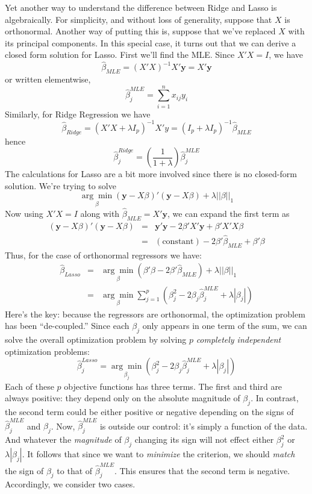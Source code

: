 Yet another way to understand the difference between Ridge and Lasso is algebraically. For simplicity, and without loss of generality, suppose that $X$ is orthonormal. Another way of putting this is, suppose that we've replaced $X$ with its principal components. In this special case, it turns out that we can derive a closed form solution for Lasso. First we'll find the MLE. Since $X'X = I$, we have
	$$\widehat{\beta}_{MLE} = (X'X)^{-1}X'\textbf{y} = X'\textbf{y}$$
or written elementwise,
	$$\widehat{\beta}^{MLE}_j = \sum_{i=1}^n x_{ij}y_i$$
Similarly, for Ridge Regression we have
	$$\widehat{\beta}_{Ridge} =\left(X'X + \lambda I_p \right)^{-1}X'y = \left(I_p + \lambda I_p \right)^{-1} \widehat{\beta}_{MLE}$$
hence
	$$\widehat{\beta}^{Ridge}_j =  \left(\frac{1}{1+\lambda}\right)\widehat{\beta}^{MLE}_j$$
The calculations for Lasso are a bit more involved since there is no closed-form solution. We're trying to solve
	$$\underset{\beta}{\arg \min} (\mathbf{y}  - X\beta)' (\mathbf{y} - X\beta) + \lambda \left| \left| \beta\right| \right|_1$$
Now using $X'X = I$ along with $\widehat{\beta}_{MLE} = X'\textbf{y}$, we can expand the first term as
	\begin{eqnarray*}
		 (\mathbf{y}  - X\beta)' (\mathbf{y} - X\beta) &=& \mathbf{y}'\mathbf{y} - 2\beta' X' \mathbf{y} + \beta' X'X \beta \\
		 	&=& (\mbox{constant}) - 2\beta' \widehat{\beta}_{MLE} + \beta'\beta
	\end{eqnarray*}
Thus, for the case of orthonormal regressors we have:
\begin{eqnarray*}
	\widehat{\beta}_{Lasso} &=& \underset{\beta}{\arg \min} (\beta'\beta - 2\beta' \widehat{\beta}_{MLE})  +  \lambda \left| \left| \beta\right| \right|_1\\
		&=& \underset{\beta}{\arg \min}  \sum_{j=1}^p \left(\beta_j^2 - 2 \beta_j \widehat{\beta}^{MLE}_j + \lambda\left|\beta_j \right|\right)
\end{eqnarray*}
Here's the key: because the regressors are orthonormal, the optimization problem has been ``de-coupled.'' Since each $\beta_j$ only appears in one term of the sum, we can solve the overall optimization problem by solving $p$ \emph{completely independent} optimization problems:
	$$\widehat{\beta}^{Lasso}_j = \underset{\beta_j}{\arg \min} \left(\beta_j^2 - 2 \beta_j \widehat{\beta}^{MLE}_j + \lambda\left|\beta_j \right|\right)$$
Each of these $p$ objective functions has three terms. The first and third are always positive: they depend only on the absolute magnitude of $\beta_j$. In contrast, the second term could be either positive or negative depending on the signs of $\widehat{\beta}^{MLE}_j$ and $\beta_j$. Now, $\widehat{\beta}^{MLE}_j$ is outside our control: it's simply a function of the data. And whatever the \emph{magnitude} of $\beta_j$ changing its sign will not effect either $\beta_j^2$ or $\lambda|\beta_j|$. It follows that since we want to \emph{minimize} the criterion, we should \emph{match} the sign of $\beta_j$ to that of $\widehat{\beta}^{MLE}_j$. This ensures that the second term is negative. Accordingly, we consider two cases. 

